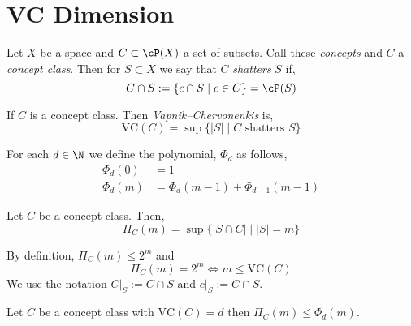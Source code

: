 \documentclass[12pt]{article}
\begin{document}
\section{VC Dimension}

\newcommand{\VC}{\mathrm{VC}}

\begin{defn}
Let $X$ be a space and $C \subset \cP(X)$ a set of subsets. Call these \textit{concepts} and $C$ a \textit{concept class}. Then for $S \subset X$ we say that $C$ \textit{shatters} $S$ if,
\[ C \cap S := \{ c \cap S \mid c \in C \} = \cP(S) \]
\end{defn}

\begin{defn}
If $C$ is a concept class. Then \textit{Vapnik–Chervonenkis} is,
\[ \VC(C) = \sup \{ |S| \mid C \text{ shatters } S \} \]
\end{defn}

\begin{defn}
For each $d \in \N$ we define the polynomial, $\Phi_d$ as follows,
\begin{align*}
\Phi_d(0) &= 1
\\
\Phi_d(m) &= \Phi_d(m-1) + \Phi_{d-1}(m-1) 
\end{align*}
\end{defn}

\begin{defn}
Let $C$ be a concept class. Then,
\[ \Pi_C(m) = \sup \{ |S \cap C| \mid |S| = m \} \]
\end{defn}

\begin{rmk}
By definition, $\Pi_C(m) \le 2^m$ and
\[ \Pi_C(m) = 2^m \iff m \le \VC(C) \]
We use the notation $C|_S := C \cap S$ and $c|_S := C \cap S$.
\end{rmk}


\begin{prop}
Let $C$ be a concept class with $\VC(C) = d$ then $\Pi_C(m) \le \Phi_d(m)$.
\end{prop}
\end{document}
